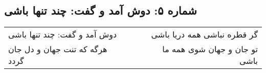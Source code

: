 \begin{center}
\section*{شماره ۵: دوش آمد و گفت: چند تنها باشی}
\label{sec:005}
\begin{longtable}{l p{0.5cm} r}
دوش آمد و گفت: چند تنها باشی
&&
گر قطره نباشی همه دریا باشی
\\
هرگه که تنت جهان و دل جان گردد
&&
تو جان و جهان شوی همه ما باشی
\\
\end{longtable}
\end{center}
